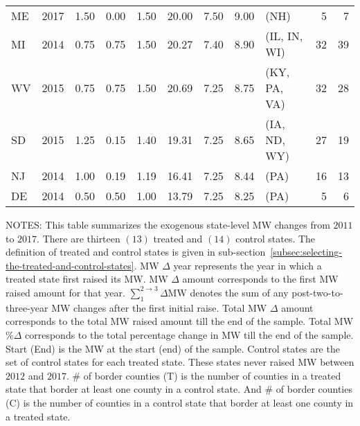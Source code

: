 \begin{table}[H]
{\begin{tabular}{lrrrrrrrlrr}
            ME             & 2017             & 1.50               & 0.00                                 & 1.50                     & 20.00               & 7.50     & 9.00   & (NH)           & 5                         & 7                         \\
            MI             & 2014             & 0.75               & 0.75                                 & 1.50                     & 20.27               & 7.40     & 8.90   & (IL, IN, WI)   & 32                        & 39                        \\
            WV             & 2015             & 0.75               & 0.75                                 & 1.50                     & 20.69               & 7.25     & 8.75   & (KY, PA, VA)   & 32                        & 28                        \\
            SD             & 2015             & 1.25               & 0.15                                 & 1.40                     & 19.31               & 7.25     & 8.65   & (IA, ND, WY)   & 27                        & 19                        \\
            NJ             & 2014             & 1.00               & 0.19                                 & 1.19                     & 16.41               & 7.25     & 8.44   & (PA)           & 16                        & 13                        \\
            DE             & 2014             & 0.50               & 0.50                                 & 1.00                     & 13.79               & 7.25     & 8.25   & (PA)           & 5                         & 6                         \\\bottomrule\bottomrule
        \end{tabular}
    }
    \begin{minipage}{\columnwidth}
        \vspace{0.01in}
        \tiny NOTES: This table summarizes the exogenous state-level MW changes from $2011$ to $2017$. There are thirteen $(13)$ treated and $(14)$ control states. The definition of treated and control states is given in sub-section~\ref{subsec:selecting-the-treated-and-control-states}. MW $\Delta$ year represents the year in which a treated state first raised its MW. MW $\Delta$ amount corresponds to the first MW raised amount for that year. $\sum_{1}^{2 \rightarrow 3}\Delta$MW denotes the sum of any post-two-to-three-year MW changes after the first initial raise. Total MW $\Delta$ amount corresponds to the total MW raised amount till the end of the sample. Total MW $\%\Delta$ corresponds to the total percentage change in MW till the end of the sample. Start (End) is the MW at the start (end) of the sample. Control states are the set of control states for each treated state. These states never raised MW between $2012$ and $2017$. \# of border counties (T) is the number of counties in a treated state that border at least one county in a control state. And \# of border counties (C) is the number of counties in a control state that border at least one county in a treated state.
    \end{minipage}
\end{table}
